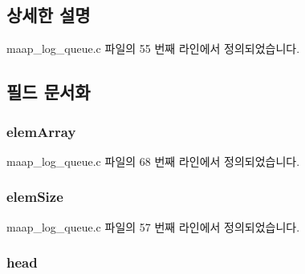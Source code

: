 \subsection{상세한 설명}


maap\+\_\+log\+\_\+queue.\+c 파일의 55 번째 라인에서 정의되었습니다.



\subsection{필드 문서화}
\subsubsection[{\texorpdfstring{elem\+Array}{elemArray}}]{ elem\+Array}\hypertarget{structmaap__log__queue_ac9d95354b061e13b286c4d7fb72fb6d7}{}\label{structmaap__log__queue_ac9d95354b061e13b286c4d7fb72fb6d7}


maap\+\_\+log\+\_\+queue.\+c 파일의 68 번째 라인에서 정의되었습니다.

\subsubsection[{\texorpdfstring{elem\+Size}{elemSize}}]{ elem\+Size}\hypertarget{structmaap__log__queue_adcb87f2809f48c3f44fc756c261ecde1}{}\label{structmaap__log__queue_adcb87f2809f48c3f44fc756c261ecde1}


maap\+\_\+log\+\_\+queue.\+c 파일의 57 번째 라인에서 정의되었습니다.

\subsubsection[{\texorpdfstring{head}{head}}]{ head}\hypertarget{structmaap__log__queue_ac8143ecb1dda85e708e5252e0106dd13}{}\label{structmaap__log__queue_ac8143ecb1dda85e708e5252e0106dd13}


